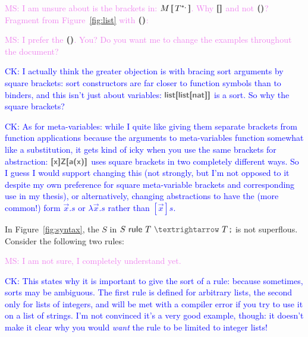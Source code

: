 \documentclass[letterpaper,11pt]{article}
\newcommand{\CK}[1]{\textcolor{blue}{CK: #1}}
\newcommand{\MS}[1]{\textcolor{violet}{MS: #1}}
\begin{document}
\MS{I am unsure about is the brackets in: $M\,\kw[\,T^{*\kw,}\,\kw]$. Why $\kw[\kw]$ and not
  $\kw(\kw)$? Fragment from Figure~\ref{fig:list} with  $\kw(\kw)$:}
\MS{I prefer the $\kw(\kw)$. You? Do you want me to change the examples throughout the document?}

\CK{I actually think the greater objection is with bracing sort arguments by
  square brackets: sort constructors are far closer to function symbols than to
  binders, and this isn't just about variables: $\kw{list[list[nat]]}$ is a
  sort.  So why the square brackets?}

\CK{As for meta-variables: while I quite like giving them separate brackets
  from function applications because the arguments to meta-variables function
  somewhat like a substitution, it gets kind of icky when you use the same
  brackets for abstraction: $\kw{[x]Z[a(x)]}$ uses square brackets in two
  completely different ways.  So I guess I would support changing this (not
  strongly, but I'm not opposed to it despite my own preference for square
  meta-variable brackets and corresponding use in my thesis), or alternatively,
  changing abstractions to have the (more common!) form $\vec{x}.s$ or
  $\lambda \vec{x}.s$ rather than $[\vec{x}]s$.}

In Figure~\ref{fig:syntax}, the $S$ in $S~\kw{rule}~T~\kw{$→$}~T\,\kw;$ is not superflous. Consider
the following two rules:
\MS{I am not sure, I completely understand yet.}

\CK{This states why it is important to give the sort of a rule: because
sometimes, sorts may be ambiguous.  The first rule is defined for arbitrary
lists, the second only for lists of integers, and will be met with a
compiler error if you try to use it on a list of strings.  I'm not convinced
it's a very good example, though: it doesn't make it clear why you would
\emph{want} the rule to be limited to integer lists!}
\end{document}
